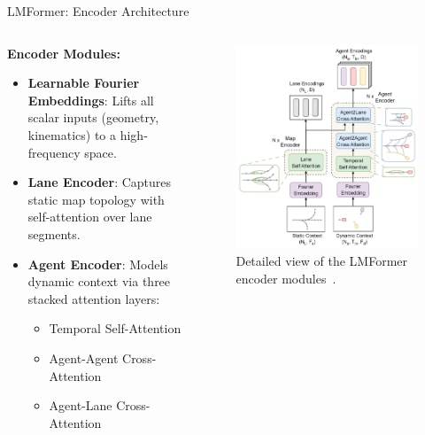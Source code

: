 \documentclass[10pt,aspectratio=169]{beamer}
\begin{document}
\begin{frame}{LMFormer: Encoder Architecture}
    \begin{columns}[T]
        \begin{column}{0.5\textwidth}
            \textbf{Encoder Modules:}
            \begin{itemize}
                \item \textbf{Learnable Fourier Embeddings}: Lifts all scalar inputs (geometry, kinematics) to a high-frequency space.
                \item \textbf{Lane Encoder}: Captures static map topology with self-attention over lane segments.
                \item \textbf{Agent Encoder}: Models dynamic context via three stacked attention layers:
                    \begin{itemize}
                        \item Temporal Self-Attention
                        \item Agent-Agent Cross-Attention
                        \item Agent-Lane Cross-Attention
                    \end{itemize}
            \end{itemize}
        \end{column}
        \begin{column}{0.5\textwidth}
            \begin{figure}
                \includegraphics[width=\textwidth]{docs/figures/lmformer_arch_encorder.png}
                \caption{Detailed view of the LMFormer encoder modules~\cite{lmformerYadav2025}.}
            \end{figure}
        \end{column}
    \end{columns}
\end{frame}
\end{document}
